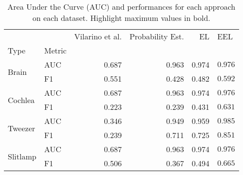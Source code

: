 \begin{table}
\centering
\caption{Area Under the Curve (AUC) and performances for each approach on each dataset. Highlight maximum values in bold.}
\label{tab:results}
\begin{tabular}{llrrrl}
\toprule
         &    &  Vilarino et al. \cite{vilarino07} &  Probability Est. &     EL &           EEL \\
Type & Metric &                                    &                   &        &               \\
\midrule
\multirow{2}{*}{Brain} & AUC &                              0.687 &             0.963 &  0.974 &  $\bm{0.976}$ \\
         & F1 &                              0.551 &             0.428 &  0.482 &  $\bm{0.592}$ \\
\cline{1-6}
\multirow{2}{*}{Cochlea} & AUC &                              0.687 &             0.963 &  0.974 &  $\bm{0.976}$ \\
         & F1 &                              0.223 &             0.239 &  0.431 &  $\bm{0.631}$ \\
\cline{1-6}
\multirow{2}{*}{Tweezer} & AUC &                              0.346 &             0.949 &  0.959 &  $\bm{0.985}$ \\
         & F1 &                              0.239 &             0.711 &  0.725 &  $\bm{0.851}$ \\
\cline{1-6}
\multirow{2}{*}{Slitlamp} & AUC &                              0.687 &             0.963 &  0.974 &  $\bm{0.976}$ \\
         & F1 &                              0.506 &             0.367 &  0.494 &  $\bm{0.665}$ \\
\bottomrule
\end{tabular}
\end{table}
